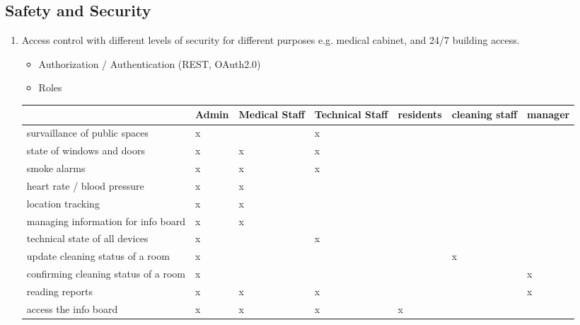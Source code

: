 \subsection{Safety and Security}
\label{sec:orgdf376cf}
\begin{enumerate}
\item Access control with different levels of security for different purposes e.g. medical cabinet, and 24/7 building access.
\label{sec:orgfd41c27}
\begin{itemize}
\item Authorization / Authentication (REST, OAuth2.0)
\item Roles
\end{itemize}
\begin{center}
\begin{tabular}{lllllll}
 & Admin & Medical Staff & Technical Staff & residents & cleaning staff & manager\\
\hline
survaillance of public spaces & x &  & x &  &  & \\
state of windows and doors & x & x & x &  &  & \\
smoke alarms & x & x & x &  &  & \\
heart rate / blood pressure & x & x &  &  &  & \\
location tracking & x & x &  &  &  & \\
managing information for info board & x & x &  &  &  & \\
technical state of all devices & x &  & x &  &  & \\
update cleaning status of a room & x &  &  &  & x & \\
confirming cleaning status of a room & x &  &  &  &  & x\\
reading reports & x & x & x &  &  & x\\
access the info board & x & x & x & x &  & \\
\end{tabular}
\end{center}




\end{enumerate}
